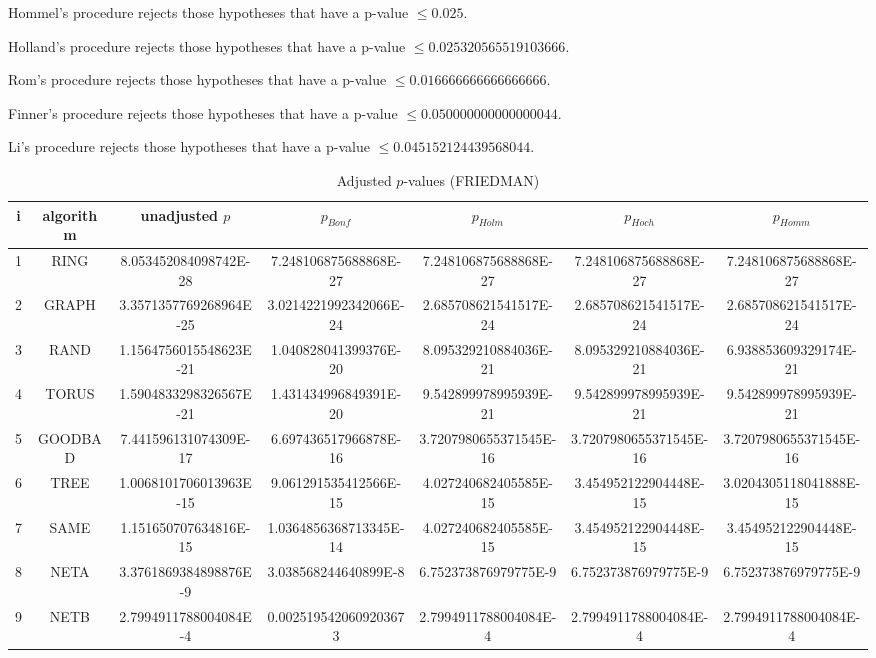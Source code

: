 \documentclass[a4paper,10pt]{article}
\begin{document}
\begin{landscape}
Hommel's procedure rejects those hypotheses that have a p-value $\le0.025$.


Holland's procedure rejects those hypotheses that have a p-value $\le0.025320565519103666$.


Rom's procedure rejects those hypotheses that have a p-value $\le0.016666666666666666$.


Finner's procedure rejects those hypotheses that have a p-value $\le0.050000000000000044$.


Li's procedure rejects those hypotheses that have a p-value $\le0.045152124439568044$.



\newpage

\begin{table}[!htp]
\centering\scriptsize
\caption{Adjusted $p$-values (FRIEDMAN)}
\begin{tabular}{ccccccc}
i&algorithm&unadjusted $p$&$p_{Bonf}$&$p_{Holm}$&$p_{Hoch}$&$p_{Homm}$\\
\hline
1& RING&8.053452084098742E-28&7.248106875688868E-27&7.248106875688868E-27&7.248106875688868E-27&7.248106875688868E-27\\
2& GRAPH&3.3571357769268964E-25&3.0214221992342066E-24&2.685708621541517E-24&2.685708621541517E-24&2.685708621541517E-24\\
3& RAND&1.1564756015548623E-21&1.040828041399376E-20&8.095329210884036E-21&8.095329210884036E-21&6.938853609329174E-21\\
4& TORUS&1.5904833298326567E-21&1.431434996849391E-20&9.542899978995939E-21&9.542899978995939E-21&9.542899978995939E-21\\
5& GOODBAD&7.441596131074309E-17&6.697436517966878E-16&3.7207980655371545E-16&3.7207980655371545E-16&3.7207980655371545E-16\\
6& TREE&1.0068101706013963E-15&9.061291535412566E-15&4.027240682405585E-15&3.454952122904448E-15&3.0204305118041888E-15\\
7& SAME&1.151650707634816E-15&1.0364856368713345E-14&4.027240682405585E-15&3.454952122904448E-15&3.454952122904448E-15\\
8& NETA&3.3761869384898876E-9&3.038568244640899E-8&6.752373876979775E-9&6.752373876979775E-9&6.752373876979775E-9\\
9& NETB&2.7994911788004084E-4&0.0025195420609203673&2.7994911788004084E-4&2.7994911788004084E-4&2.7994911788004084E-4\\
\hline
\end{tabular}
\end{table}


\end{landscape}
\end{document}
